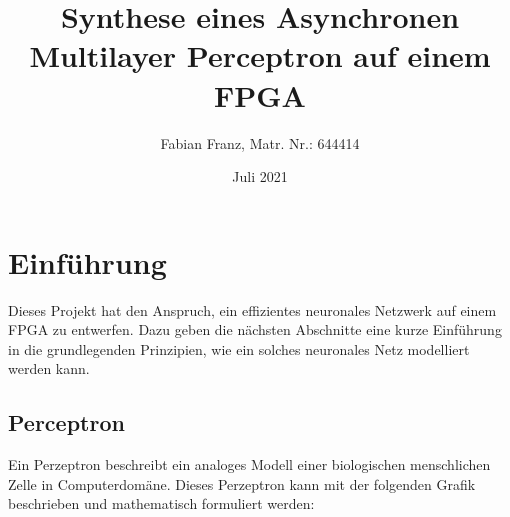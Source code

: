 \documentclass{article}
\title{Synthese eines Asynchronen Multilayer Perceptron auf einem FPGA}
\author{Fabian Franz, Matr. Nr.: 644414}
\date{Juli 2021}
\numberwithin{equation}{section}
\begin{document}
\maketitle

\pagebreak
\tableofcontents
\pagebreak

\section{Einführung}
Dieses Projekt hat den Anspruch, ein effizientes neuronales Netzwerk auf einem FPGA zu
entwerfen. Dazu geben die nächsten Abschnitte eine kurze Einführung in die grundlegenden
Prinzipien, wie ein solches neuronales Netz modelliert werden kann.

\subsection{Perceptron}
Ein Perzeptron beschreibt ein analoges Modell einer biologischen menschlichen Zelle in
Computerdomäne. Dieses Perzeptron kann mit der folgenden Grafik beschrieben und mathematisch
formuliert werden:
\end{document}
